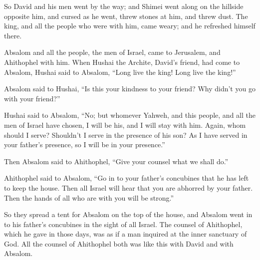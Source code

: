 {So David and his men went by the way; and Shimei went along on the hillside opposite him, and cursed as he went, threw stones at him, and threw dust.
The king, and all the people who were with him, came weary; and he refreshed himself there.
\par }{\PP {}Absalom and all the people, the men of Israel, came to Jerusalem, and Ahithophel with him.
When Hushai the Archite, David’s friend, had come to Absalom, Hushai said to Absalom, “Long live the king! Long live the king!”
\par }{\PP {}Absalom said to Hushai, “Is this your kindness to your friend? Why didn’t you go with your friend?”
\par }{\PP {}Hushai said to Absalom, “No; but whomever Yahweh, and this people, and all the men of Israel have chosen, I will be his, and I will stay with him.
Again, whom should I serve? Shouldn’t I serve in the presence of his son? As I have served in your father’s presence, so I will be in your presence.”
\par }{\PP {}Then Absalom said to Ahithophel, “Give your counsel what we shall do.”
\par }{\PP {}Ahithophel said to Absalom, “Go in to your father’s concubines that he has left to keep the house. Then all Israel will hear that you are abhorred by your father. Then the hands of all who are with you will be strong.”
\par }{\PP {}So they spread a tent for Absalom on the top of the house, and Absalom went in to his father’s concubines in the sight of all Israel.
The counsel of Ahithophel, which he gave in those days, was as if a man inquired at the inner sanctuary of God. All the counsel of Ahithophel both was like this with David and with Absalom.

}
